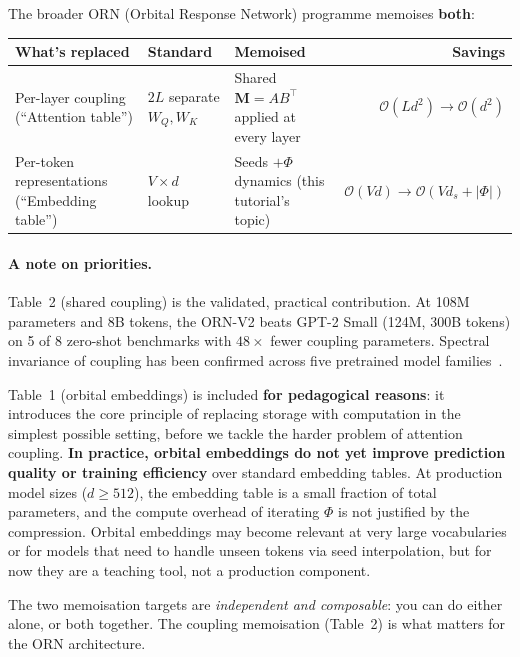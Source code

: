 \documentclass[11pt, a4paper]{article}
\newcommand{\M}{\mathbf{M}}
\newcommand{\bigO}{\mathcal{O}}
\theoremstyle{remark}
\begin{document}
\noindent
The broader ORN (Orbital Response Network) programme memoises \textbf{both}:

\begin{center}\small
\renewcommand{\arraystretch}{1.4}
\begin{tabular}{@{}p{3.5cm}p{4cm}p{4cm}r@{}}
\toprule
\textbf{What's replaced} & \textbf{Standard} & \textbf{Memoised} & \textbf{Savings} \\
\midrule
Per-layer coupling \newline (``Attention table'') & $2L$ separate $W_Q, W_K$ & Shared $\M = AB^\top$ \newline applied at every layer & $\bigO(Ld^2) \to \bigO(d^2)$ \\[6pt]
Per-token representations \newline (``Embedding table'') & $V \times d$ lookup & Seeds $+ \Phi$ dynamics \newline (this tutorial's topic) & $\bigO(Vd) \to \bigO(Vd_s + |\Phi|)$ \\
\bottomrule
\end{tabular}
\end{center}

\paragraph{A note on priorities.}
Table~2 (shared coupling) is the validated, practical contribution.
At 108M parameters and 8B tokens, the ORN-V2 beats GPT-2 Small (124M, 300B tokens) on 5 of 8 zero-shot benchmarks with $48\times$ fewer coupling parameters.
Spectral invariance of coupling has been confirmed across five pretrained model families~\cite{masa2025, pan2024, mu2024}.

Table~1 (orbital embeddings) is included \textbf{for pedagogical reasons}: it introduces the core principle of replacing storage with computation in the simplest possible setting, before we tackle the harder problem of attention coupling.
\textbf{In practice, orbital embeddings do not yet improve prediction quality or training efficiency} over standard embedding tables.
At production model sizes ($d \geq 512$), the embedding table is a small fraction of total parameters, and the compute overhead of iterating $\Phi$ is not justified by the compression.
Orbital embeddings may become relevant at very large vocabularies or for models that need to handle unseen tokens via seed interpolation, but for now they are a teaching tool, not a production component.

The two memoisation targets are \emph{independent and composable}: you can do either alone, or both together.
The coupling memoisation (Table~2) is what matters for the ORN architecture.
\end{document}
